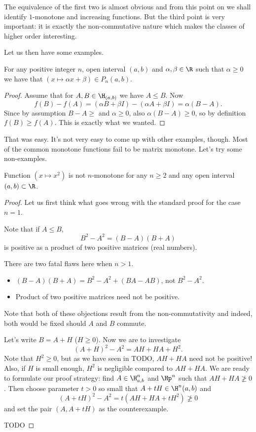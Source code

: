 The equivalence of the first two is almost obvious and from this point on we shall identify $1$-monotone and increasing functions. But the third point is very important: it is exactly the non-commutative nature which makes the classes of higher order interesting.

Let us then have some examples.

\begin{prop}
	For any positive integer $n$, open interval $(a, b)$ and $\alpha, \beta \in \R$ such that $\alpha \geq 0$ we have that $(x \mapsto \alpha x + \beta) \in P_{n}(a, b)$.
\end{prop}
\begin{proof}
	Assume that for $A, B \in \H_{(a, b)}$ we have $A \leq B$. Now
	\[
		f(B) - f(A) = (\alpha B + \beta I) - (\alpha A + \beta I) = \alpha (B - A).
	\]
	Since by assumption $B - A \geq $ and $\alpha \geq 0$, also $\alpha (B - A) \geq 0$, so by definition $f(B) \geq f(A)$. This is exactly what we wanted.
\end{proof}

That was easy. It's not very easy to come up with other examples, though. Most of the common monotone functions fail to be matrix monotone. Let's try some non-examples.

\begin{prop}
	Function $(x \mapsto x^2)$ is not $n$-monotone for any $n \geq 2$ and any open interval $(a, b) \subset \R$.
\end{prop}
\begin{proof}
	Let us first think what goes wrong with the standard proof for the case $n = 1$.

	Note that if $A \leq B$,
	\[
		B^2 - A^2 = (B - A) (B + A)
	\]
	is positive as a product of two positive matrices (real numbers).

	There are two fatal flaws here when $n > 1$.
	\begin{itemize}
		\item $(B - A) (B + A) = B^2-A^2 + (B A - A B)$, not $B^2 - A^2$.
		\item Product of two positive matrices need not be positive.
	\end{itemize}
	Note that both of these objections result from the non-commutativity and indeed, both would be fixed should $A$ and $B$ commute.

	Let's write $B = A + H$ ($H \geq 0$). Now we are to investigate
	\[
		(A + H)^2-A^2 = A H + H A + H^2.
	\]
	Note that $H^2 \geq 0$, but as we have seen in TODO, $A H + H A$ need not be positive! Also, if $H$ is small enough, $H^2$ is negligible compared to $AH + HA$. We are ready to formulate our proof strategy: find $A \in \H^{n}_{a, b}$ and $\Hp^{n}$ such that $A H + H A \ngeq 0$. Then choose parameter $t > 0$ so small that $A + t H \in \H^{n}(a,b)$ and
	\[
		(A + t H)^2 - A^2 = t (A H + H A + t H^2) \ngeq 0
	\]
	and set the pair $(A, A + t H)$ as the counterexample.

	TODO
\end{proof}

